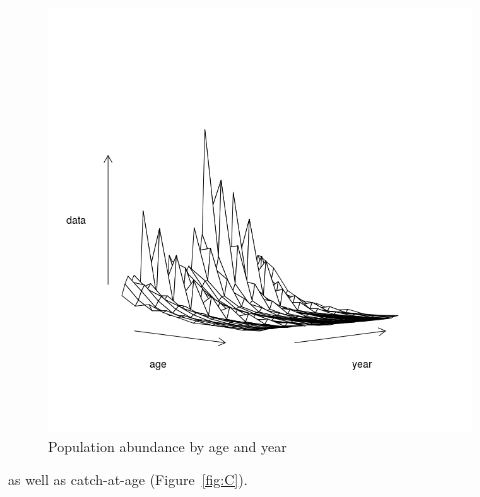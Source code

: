 \documentclass[a4paper,english,10pt]{article}\usepackage[]{graphicx}\usepackage[]{color}
\newenvironment{knitrout}{}{} %
\begin{document}
\begin{knitrout}
\color{fgcolor}\begin{figure}[H]

{\centering \includegraphics[width=.9\linewidth]{figure/N-1} 

}

\caption[Population abundance by age and year]{Population abundance by age and year}\label{fig:N}
\end{figure}


\end{knitrout}

as well as catch-at-age (Figure~\ref{fig:C}).
\end{document}
